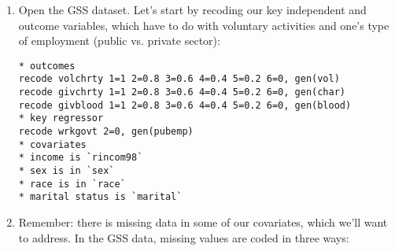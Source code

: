 \documentclass[a4paper,12pt]{article}
\begin{document}
\begin{enumerate}
\noindent Note how \texttt{newvar} is assumed to be time-invariant even though we didn't manually specify it \texttt{i()}. Every country-year observation now has the same value of \texttt{newvar}. The \texttt{diff2000} and \texttt{diff2010} variables were handled differently, though. Because they had a year in their name (like all the other time-variant variables), they were assumed to be time-variant, as well. If we do not specify \texttt{diff} in the \texttt{varlist} portion of the \texttt{reshape} command, then these variables are assumed to be time-invariant (just like \texttt{newvar} was by default). Knowing how to convert data from wide to long and vice versa is an invaluable skill to have, but the process can produce all kinds of errors. When you encounter errors, read the error messages, use the help files, and examine your data to see what might be causing the problem(s).


\section*{Missing Data Handling}

For this part of the lab, we will use data from the General Social Survey, a nationally representative survey of the United States population. These data, in Stata (.dta) format, are available to you on Blackboard in the \texttt{XXXX} folder. These data are used in an article we'll revisit later in the course.\footnote{Houston, David J. 2005. ```Walking the Walk' of Public Service Motivation: Public Employees and Charitable Gifts of Time, Blood, and Money.'' {\em Journal of Public Administration Research and Theory} 16: 67--86. doi:10.1093/jopart/mui028.}

\item Open the GSS dataset. Let's start by recoding our key independent and outcome variables, which have to do with voluntary activities and one's type of employment (public vs. private sector):
\begin{verbatim}
* outcomes
recode volchrty 1=1 2=0.8 3=0.6 4=0.4 5=0.2 6=0, gen(vol)
recode givchrty 1=1 2=0.8 3=0.6 4=0.4 5=0.2 6=0, gen(char)
recode givblood 1=1 2=0.8 3=0.6 4=0.4 5=0.2 6=0, gen(blood)
* key regressor
recode wrkgovt 2=0, gen(pubemp)
* covariates
* income is `rincom98`
* sex is in `sex`
* race is in `race`
* marital status is `marital`
\end{verbatim}

\item Remember: there is missing data in some of our covariates, which we'll want to address. In the GSS data, missing values are coded in three ways:


\end{enumerate}
\end{document}

